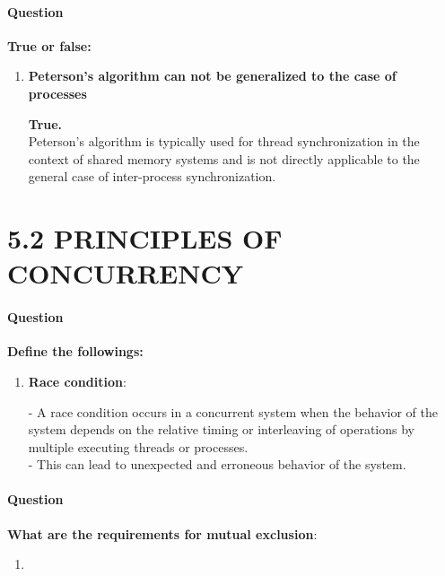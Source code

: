 \documentclass[a4paper,12pt,fleqn]{article}
\newcounter{question}
\newcommand*\question{%
\stepcounter{question}%
\paragraph{Question \thequestion}}
\begin{document}
\question \textbf{True or false:}
\begin{enumerate}
	\item \textbf{Peterson’s algorithm can not be generalized to the case of processes}
	\begin{answer}
		\textbf{True.} \\
		Peterson's algorithm is typically used for thread synchronization in the context of shared memory systems and is not directly applicable to the general case of inter-process synchronization.
	\end{answer}
\end{enumerate}

\section*{5.2 PRINCIPLES OF CONCURRENCY}
\question \textbf{Define the followings:}
\begin{enumerate}
	\item \textbf{Race condition}:
	\begin{answer}
		- A race condition occurs in a concurrent system when the behavior of the system depends on the relative timing or interleaving of operations by multiple executing threads or processes.\\
		- This can lead to unexpected and erroneous behavior of the system.
	\end{answer}
	\end{enumerate}
\question \textbf{What are the requirements for mutual exclusion}:
	\begin{enumerate}
		\item
\end{enumerate}
\end{document}
